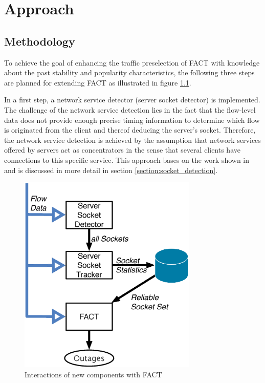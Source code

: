 

\chapter{Approach
\label{chapter:approach}}

\section{Methodology
\label{section:methodology}}

To achieve the goal of enhancing the traffic preselection of \gls{FACT} with
knowledge about the past stability and popularity characteristics, the following
three steps are planned for extending \gls{FACT} as illustrated in figure 
\ref{fig:FACT}.

In a first step, a network service detector (server socket detector) is 
implemented. The challenge of the network service detection lies in the fact 
that the flow-level data does not provide enough precise timing information to 
determine which flow is originated from the client and thereof deducing the 
server's socket\citep{Trammell}. Therefore, the network service detection is 
achieved by the assumption that network services offered by servers act as 
concentrators in the sense that several clients have connections to this 
specific service. This approach bases on the work shown in 
\cite{Schatzmann:Dissection, Schatzmann:Mining, Schatzmann:Tracing} and is 
discussed in more detail in section \ref{section:socket_detection}.

\begin{figure}
	[t] \centering
	\includegraphics[width=8.5cm]{images/Approach_blockdiagram.eps}
	\caption{Interactions of new components with \gls{FACT}} 
	\label{fig:FACT} 
\end{figure}

